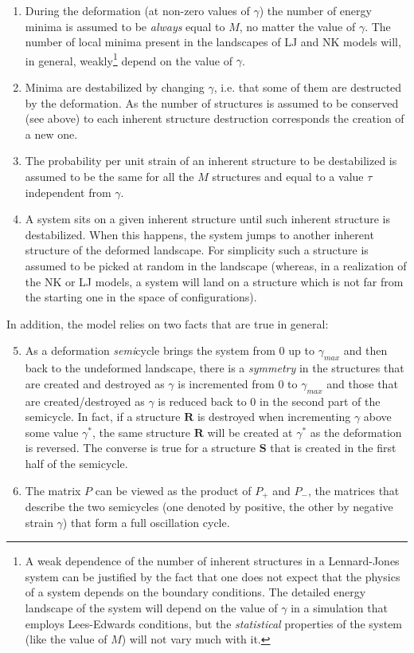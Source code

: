\begin{enumerate}
		\item During the deformation (at non-zero values of $\gamma$) the number of energy minima is assumed to be \emph{always} equal to $M$, no matter the value of $\gamma$. The number of local minima present in the landscapes of LJ and NK models will, in general, weakly\footnote{A weak dependence of the number of inherent structures in a Lennard-Jones system can be justified by the fact that one does not expect that the physics of a system depends on the boundary conditions. The detailed energy landscape of the system will depend on the value of $\gamma$ in a simulation that employs Lees-Edwards conditions, but the \emph{statistical} properties of the system (like the value of $M$) will not vary much with it.} depend on the value of $\gamma$.  
		\item Minima are destabilized by changing $\gamma$, i.e. that some of them are destructed by the deformation. As the number of structures is assumed to be conserved (see above) to each inherent structure destruction corresponds the creation of a new one.
		\item The probability per unit strain of an inherent structure to be destabilized is assumed to be the same for all the $M$ structures and equal to a value $\tau$ independent from $\gamma$.
		\item A system sits on a given inherent structure until such inherent structure is destabilized. When this happens, the system jumps to another inherent structure of the deformed landscape. For simplicity such a structure is assumed to be picked at random in the landscape (whereas, in a realization of the NK or LJ models, a system will land on a structure which is not far from the starting one in the space of configurations).
\end{enumerate}

In addition, the model relies on two facts that are true in general:

\begin{enumerate}
		\setcounter{enumi}{4}
		\item As a deformation \emph{semi}cycle brings the system from 0 up to $\gamma_{max}$ and then back to the undeformed landscape, there is a \emph{symmetry} in the structures that are created and destroyed as $\gamma$ is incremented from $0$ to $\gamma_{max}$ and those that are created/destroyed as $\gamma$ is reduced back to 0 in the second part of the semicycle. In fact, if a structure $\mathbf{R}$ is destroyed when incrementing $\gamma$ above some value $\gamma^{*}$, the same structure $\mathbf{R}$ will be created at $\gamma^{*}$ as the deformation is reversed. The converse is true for a structure $\mathbf{S}$ that is created in the first half of the semicycle.
		\item The matrix $P$ can be viewed as the product of $P_{+}$ and $P_{-}$, the matrices that describe the two semicycles (one denoted by positive, the other by negative strain $\gamma$) that form a full oscillation cycle.		
\end{enumerate}

